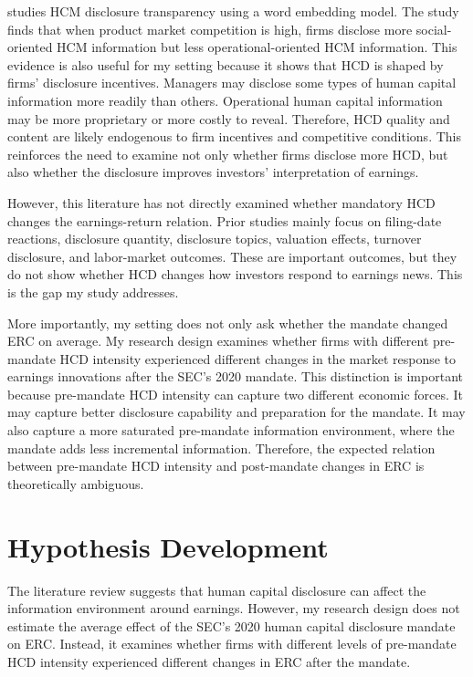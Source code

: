 \documentclass[12pt]{article}
\begin{document}
\citet{zhang2022} studies HCM disclosure transparency using a word embedding model. The study finds that when product market competition is high, firms disclose more social-oriented HCM information but less operational-oriented HCM information. This evidence is also useful for my setting because it shows that HCD is shaped by firms' disclosure incentives. Managers may disclose some types of human capital information more readily than others. Operational human capital information may be more proprietary or more costly to reveal. Therefore, HCD quality and content are likely endogenous to firm incentives and competitive conditions. This reinforces the need to examine not only whether firms disclose more HCD, but also whether the disclosure improves investors' interpretation of earnings.

However, this literature has not directly examined whether mandatory HCD changes the earnings-return relation. Prior studies mainly focus on filing-date reactions, disclosure quantity, disclosure topics, valuation effects, turnover disclosure, and labor-market outcomes. These are important outcomes, but they do not show whether HCD changes how investors respond to earnings news. This is the gap my study addresses.

More importantly, my setting does not only ask whether the mandate changed ERC on average. My research design examines whether firms with different pre-mandate HCD intensity experienced different changes in the market response to earnings innovations after the SEC's 2020 mandate. This distinction is important because pre-mandate HCD intensity can capture two different economic forces. It may capture better disclosure capability and preparation for the mandate. It may also capture a more saturated pre-mandate information environment, where the mandate adds less incremental information. Therefore, the expected relation between pre-mandate HCD intensity and post-mandate changes in ERC is theoretically ambiguous.

\section{Hypothesis Development}

The literature review suggests that human capital disclosure can affect the information environment around earnings. However, my research design does not estimate the average effect of the SEC's 2020 human capital disclosure mandate on ERC. Instead, it examines whether firms with different levels of pre-mandate HCD intensity experienced different changes in ERC after the mandate.
\end{document}
